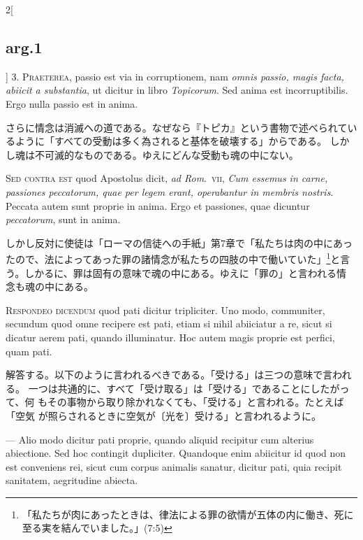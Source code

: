 \documentclass[paper=a4paper,fontsize=10pt,jafontsize=9pt,titlepage]{jlreq}
\begin{document}
\begin{paracol}{2}[\subsection{arg.1}]
3. {\scshape Praeterea}, passio est via in corruptionem, nam {\itshape omnis passio, magis
 facta, abiicit a substantia}, ut dicitur in libro {\itshape Topicorum}. Sed anima
 est incorruptibilis. Ergo nulla passio est in anima.

\switchcolumn

さらに情念は消滅への道である。なぜなら『トピカ』という書物で述べられてい
 るように「すべての受動は多く為されると基体を破壊する」からである。
しかし魂は不可滅的なものである。ゆえにどんな受動も魂の中にない。

\switchcolumn*[\subsection{s.c.}]

{\scshape Sed contra est} quod Apostolus dicit, {\itshape ad Rom}.~{\scshape vii}, {\itshape Cum essemus in carne,
 passiones peccatorum, quae per legem erant, operabantur in membris
 nostris}. Peccata autem sunt proprie in anima. Ergo et passiones, quae
 dicuntur {\itshape peccatorum}, sunt in anima.

\switchcolumn

しかし反対に使徒は「ローマの信徒への手紙」第7章で「私たちは肉の中にあっ
 たので、法によってあった罪の諸情念が私たちの四肢の中で働いていた」\footnote{「私たちが肉にあったときは、律法による罪の欲情が五体の内に働き、死に至る実を結んでいました。」(7:5)}と言
 う。しかるに、罪は固有の意味で魂の中にある。ゆえに「罪の」と言われる情
 念も魂の中にある。


{\scshape Respondeo dicendum} quod pati dicitur tripliciter. Uno modo, communiter,
 secundum quod omne recipere est pati, etiam si nihil abiiciatur a re,
 sicut si dicatur aerem pati, quando illuminatur. Hoc autem magis
 proprie est perfici, quam pati.

\switchcolumn

解答する。以下のように言われるべきである。「受ける」は三つの意味で言われる。
一つは共通的に、すべて「受け取る」は「受ける」であることにしたがって、何
 もその事物から取り除かれなくても、「受ける」と言われる。たとえば「空気
 が照らされるときに空気が〔光を〕受ける」と言われるように。

\switchcolumn*

--- Alio modo dicitur pati proprie, quando
 aliquid recipitur cum alterius abiectione. Sed hoc contingit
 dupliciter. Quandoque enim abiicitur id quod non est conveniens rei,
 sicut cum corpus animalis sanatur, dicitur pati, quia recipit
 sanitatem, aegritudine abiecta.


\end{paracol}
\end{document}
